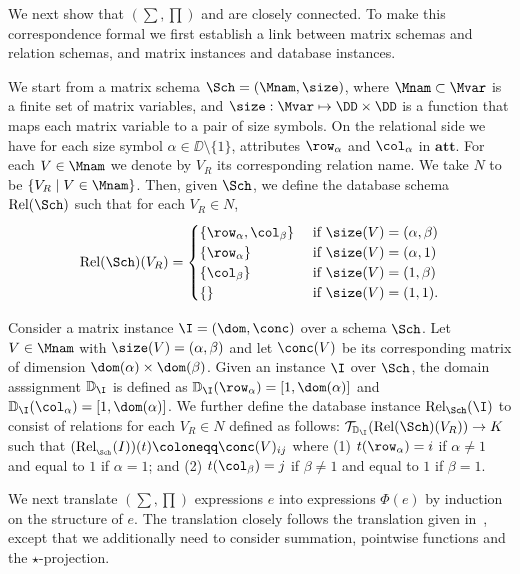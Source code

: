 \newcommand{\remark}[1]{\textcolor{darkgray}{\bf Remark: }\textcolor{gray}{#1} }
We next show that \lang$(\sum,\prod)$ and \ARA are closely connected. To make this correspondence formal we first establish a link between matrix schemas and relation schemas, and matrix instances and database instances. 

We start from a matrix schema $\Sch=(\Mnam,\size)$, where $\Mnam\subset \Mvar$ is a finite set of matrix variables, and $\size: \Mvar \mapsto \DD\times \DD$ is a function that maps each matrix variable to a pair of size symbols. On the relational side
we have for each size symbol $\alpha\in\DD\setminus\{1\}$, attributes $\row_\alpha$ and $\col_\alpha$ in $\mathbf{att}$. For each $V\in\Mnam$ we denote
by $V_R$ its corresponding relation name. We take $N$ to be $\{V_R\mid V\in\Mnam\}$. Then, given $\Sch$, we define the database  schema $\text{Rel}(\Sch)$ such that for each $V_R\in N$,
\[
	\text{Rel}(\Sch)(V_R) = \begin{cases}
		\lbrace\row_\alpha,\col_\beta \rbrace & \text{ if $ \size(V)=(\alpha,\beta)$} \\
		\lbrace\row_\alpha \rbrace & \text{ if $ \size(V)=(\alpha,1)$} \\
		\lbrace\col_\beta \rbrace  &
	 \text{ if $ \size(V)=(1,\beta)$} \\
		\lbrace\rbrace & \text{ if $\size(V)=(1,1)$}.
\end{cases}
\]

Consider a matrix instance $\I = (\dom,\conc)$ over a schema $\Sch$.
Let $V\in\Mnam$ with $\size(V)=(\alpha,\beta)$ and let $\conc(V)$ be its corresponding matrix of dimension $\dom(\alpha)\times \dom(\beta)$.
Given an instance $\I$ over $\Sch$, the domain asssignment $\mathbb{D}_{\I}$ is defined as 
$\mathbb{D}_{\I}(\row_\alpha)=[1,\dom(\alpha)]$ and 
$\mathbb{D}_{\I}(\col_\alpha)=[1,\dom(\alpha)]$. 
We further  define the database instance $\text{Rel}_\Sch(\I)$  to consist of relations for each $V_R\in N$ defined as follows:
$\mathcal{T}_{\mathbb{D}_{\I}}(\text{Rel}(\Sch)(V_R)) \to K$ such that
$(\text{Rel}_{_\Sch}(I))(t)\coloneqq \conc(V)_{ij}$ where (1) $t(\row_\alpha)=i$ if $\alpha\neq 1$ and equal to $1$ if $\alpha = 1$; and (2) $t(\col_\beta)=j$ if $\beta\neq 1$ and equal to $1$ if $\beta= 1$.

We next translate \lang$(\sum,\prod)$ expressions $e$ into \ARA expressions $\Phi(e)$ by induction on the structure of $e$. The translation closely follows the translation given in~\cite{brijder2019matrices}, except that we  additionally need to consider summation, pointwise functions and the $\star$-projection.

